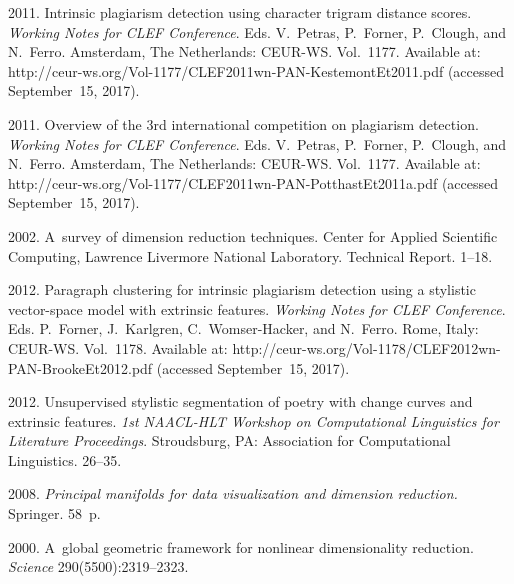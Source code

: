 \begin{multicols}{2}
{{\begin{thebibliography}{99}
  2011. Intrinsic plagiarism detection using character trigram distance scores. 
  \textit{Working Notes for CLEF Conference}. 
  Eds. V.~Petras, P.~Forner, P.~Clough, and N.~Ferro.
 Amsterdam, The Netherlands: CEUR-WS. Vol.~1177. 
Available at:  {\sf http://ceur-ws.org/Vol-1177/CLEF2011wn-PAN-\linebreak KestemontEt2011.pdf} 
 (accessed September~15, 2017).

2011. Overview of the 3rd international competition on plagiarism detection. 
\textit{Working Notes for CLEF Conference}. Eds. V.~Petras, P.~Forner, P.~Clough, 
and N.~Ferro. Amsterdam, The Netherlands: CEUR-WS. Vol.~1177. 
Available at: {\sf http://ceur-ws.org/Vol-1177/CLEF2011wn-PAN-\linebreak PotthastEt2011a.pdf}
(accessed September~15, 2017).


 2002. A~survey of dimension reduction techniques. 
{Center for Applied Scientific Computing, Lawrence Livermore National 
Laboratory}. Technical Report. 1--18.

   2012. 
  Paragraph clustering for intrinsic plagiarism detection using a stylistic 
  vector-space model with extrinsic features. \textit{Working Notes for CLEF Conference}.
  Eds. P.~Forner, J.~Karlgren, C.~Womser-Hacker, 
  and N.~Ferro. Rome, Italy: CEUR-WS. Vol.~1178. 
Available at:   {\sf http://ceur-ws.org/Vol-1178/CLEF2012wn-PAN-BrookeEt2012.pdf}
(accessed September~15, 2017).

   2012. Unsupervised stylistic 
  segmentation of poetry with change curves and extrinsic features. 
  \textit{1st NAACL-HLT Workshop on Computational Linguistics for Literature
  Proceedings}.  Stroudsburg, PA: Association for Computational Linguistics. 26--35.

 2008. \textit{Principal manifolds for data visualization 
and dimension reduction.} Springer. 58~p.

   2000. 
  A~global geometric framework for nonlinear dimensionality reduction. 
  \textit{Science} 290(5500):2319--2323.


\end{thebibliography}}}
\end{multicols}
